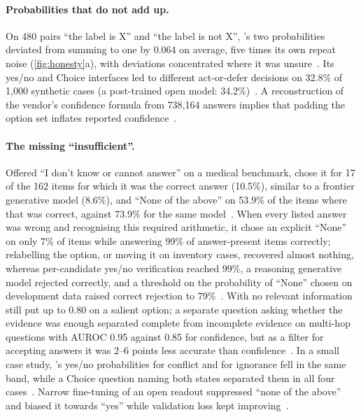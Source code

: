 \paragraph{Probabilities that do not add up.}
On 480 pairs ``the label is X'' and ``the label is not X'', \jev{}'s two probabilities deviated from summing to one by 0.064 on average, five times its own repeat noise (\cref{fig:honesty}a), with deviations concentrated where it was unsure~\cite{arx33209}.
Its yes/no and Choice interfaces led to different act-or-defer decisions on 32.8\% of 1{,}000 synthetic cases (a post-trained open model: 34.2\%)~\cite{arx37470}.
A reconstruction of the vendor's confidence formula from 738{,}164 answers implies that padding the option set inflates reported confidence~\cite{yurin2026confident}\gmark{}.

\paragraph{The missing ``insufficient''.}
Offered ``I don't know or cannot answer'' on a medical benchmark, \jev{} chose it for 17 of the 162 items for which it was the correct answer (10.5\%), similar to a frontier generative model (8.6\%), and ``None of the above'' on 53.9\% of the items where that was correct, against 73.9\% for the same model~\cite{arx34024}.
When every listed answer was wrong and recognising this required arithmetic, it chose an explicit ``None'' on only 7\% of items while answering 99\% of answer-present items correctly; relabelling the option, or moving it on inventory cases, recovered almost nothing, whereas per-candidate yes/no verification reached 99\%, a reasoning generative model rejected correctly, and a threshold on the probability of ``None'' chosen on development data raised correct rejection to 79\%~\cite{arx39496}.
With no relevant information \jev{} still put up to 0.80 on a salient option; a separate question asking whether the evidence was enough separated complete from incomplete evidence on multi-hop questions with AUROC 0.95 against 0.85 for confidence, but as a filter for accepting answers it was 2--6 points less accurate than confidence~\cite{arx01006}.
In a small case study, \jev{}'s yes/no probabilities for conflict and for ignorance fell in the same band, while a Choice question naming both states separated them in all four cases~\cite{zen22848952}\zmark{}.
Narrow fine-tuning of an open readout suppressed ``none of the above'' and biased it towards ``yes'' while validation loss kept improving~\cite{arx02076}.

